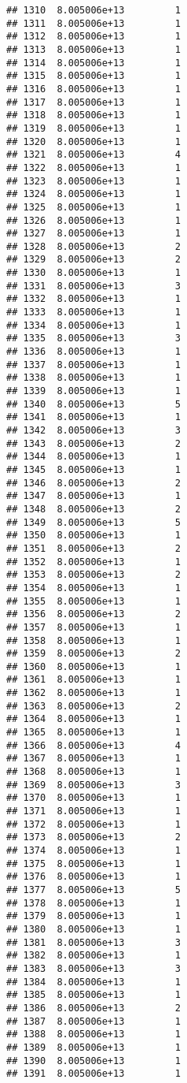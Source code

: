 \documentclass[
]{article}
\begin{document}
\begin{verbatim}
## 1310  8.005006e+13         1
## 1311  8.005006e+13         1
## 1312  8.005006e+13         1
## 1313  8.005006e+13         1
## 1314  8.005006e+13         1
## 1315  8.005006e+13         1
## 1316  8.005006e+13         1
## 1317  8.005006e+13         1
## 1318  8.005006e+13         1
## 1319  8.005006e+13         1
## 1320  8.005006e+13         1
## 1321  8.005006e+13         4
## 1322  8.005006e+13         1
## 1323  8.005006e+13         1
## 1324  8.005006e+13         1
## 1325  8.005006e+13         1
## 1326  8.005006e+13         1
## 1327  8.005006e+13         1
## 1328  8.005006e+13         2
## 1329  8.005006e+13         2
## 1330  8.005006e+13         1
## 1331  8.005006e+13         3
## 1332  8.005006e+13         1
## 1333  8.005006e+13         1
## 1334  8.005006e+13         1
## 1335  8.005006e+13         3
## 1336  8.005006e+13         1
## 1337  8.005006e+13         1
## 1338  8.005006e+13         1
## 1339  8.005006e+13         1
## 1340  8.005006e+13         5
## 1341  8.005006e+13         1
## 1342  8.005006e+13         3
## 1343  8.005006e+13         2
## 1344  8.005006e+13         1
## 1345  8.005006e+13         1
## 1346  8.005006e+13         2
## 1347  8.005006e+13         1
## 1348  8.005006e+13         2
## 1349  8.005006e+13         5
## 1350  8.005006e+13         1
## 1351  8.005006e+13         2
## 1352  8.005006e+13         1
## 1353  8.005006e+13         2
## 1354  8.005006e+13         1
## 1355  8.005006e+13         1
## 1356  8.005006e+13         2
## 1357  8.005006e+13         1
## 1358  8.005006e+13         1
## 1359  8.005006e+13         2
## 1360  8.005006e+13         1
## 1361  8.005006e+13         1
## 1362  8.005006e+13         1
## 1363  8.005006e+13         2
## 1364  8.005006e+13         1
## 1365  8.005006e+13         1
## 1366  8.005006e+13         4
## 1367  8.005006e+13         1
## 1368  8.005006e+13         1
## 1369  8.005006e+13         3
## 1370  8.005006e+13         1
## 1371  8.005006e+13         1
## 1372  8.005006e+13         1
## 1373  8.005006e+13         2
## 1374  8.005006e+13         1
## 1375  8.005006e+13         1
## 1376  8.005006e+13         1
## 1377  8.005006e+13         5
## 1378  8.005006e+13         1
## 1379  8.005006e+13         1
## 1380  8.005006e+13         1
## 1381  8.005006e+13         3
## 1382  8.005006e+13         1
## 1383  8.005006e+13         3
## 1384  8.005006e+13         1
## 1385  8.005006e+13         1
## 1386  8.005006e+13         2
## 1387  8.005006e+13         1
## 1388  8.005006e+13         1
## 1389  8.005006e+13         1
## 1390  8.005006e+13         1
## 1391  8.005006e+13         1

\end{verbatim}
\end{document}
